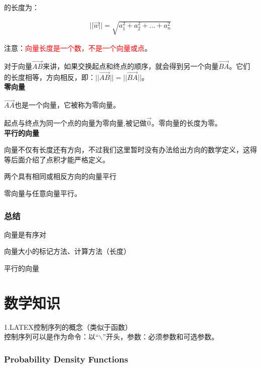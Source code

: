 \documentclass[UTF8]{ctexart}
\begin{document}
的长度为：

\begin{equation}
\begin{aligned}
||\vec{w}||=\sqrt{a_{1}^{2}+a_{2}^{2}+\dots+a_{n}^{2}}
\end{aligned}
\end{equation}

注意：\textcolor{red}{向量长度是一个数，不是一个向量或点}。

对于向量$\overrightarrow{AB}$来讲，如果交换起点和终点的顺序，就会得到另一个向量$\overrightarrow{BA}$。它们的长度相等，方向相反，即：$||\overrightarrow{AB}||=||\overrightarrow{BA}||$。\\

\textbf{零向量}

$\overrightarrow{AA}$也是一个向量，它被称为零向量。

起点与终点为同一个点的向量为零向量,被记做$\vec{0}$。零向量的长度为零。\\

\textbf{平行的向量}

向量不仅有长度还有方向，不过我们这里暂时没有办法给出方向的数学定义，这得等后面介绍了点积才能严格定义。 

两个具有相同或相反方向的向量平行

零向量与任意向量平行。 

\subsubsection{总结}

向量是有序对

向量大小的标记方法、计算方法（长度）

平行的向量











\section{数学知识}
    1.LATEX控制序列的概念（类似于函数） \\ 控制序列可以是作为命令：以“$\backslash$”开头，参数：必须参数和可选参数。

    
    
\subsubsection{Probability Density Functions}
\end{document}
